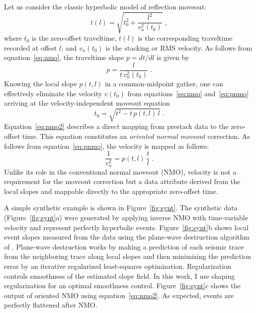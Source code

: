 
Let us consider the classic hyperbolic model of reflection moveout:
\begin{equation}
  \label{eq:nmo}
  t(l) = \sqrt{t_0^2 + \frac{l^2}{v_n^2(t_0)}}\;,
\end{equation}
where $t_0$ is the zero-offset traveltime, $t(l)$ is the corresponding
traveltime recorded at offset $l$, and $v_n(t_0)$ is the stacking or
RMS velocity. As follows from equation~\ref{eq:nmo}, the traveltime slope $p= d t/d l$ is given by 
\begin{equation}
  {p} = {\frac{l}{t\,v_n^2(t_0)}}\;.
  \label{eq:pnmo}
\end{equation}
Knowing the local slope $p(t,l)$ in a common-midpoint gather, one can
effectively eliminate the velocity $v(t_0)$ from
equations~\ref{eq:nmo} and~\ref{eq:pnmo} arriving at the
velocity-independent moveout equation \cite[]{Ottolini.sep.37.59}
\begin{equation}
  \label{eq:nmo2}
  t_0 = \sqrt{t^2 - t\,p(t,l)\,l}\;.
\end{equation}
Equation~\ref{eq:nmo2} describes a direct mapping from prestack data
to the zero-offset time. This equation constitutes an \emph{oriented
normal moveout} correction. As follows from equation~\ref{eq:pnmo},
the velocity is mapped as follows:
\begin{equation}
  {\frac{1}{v_n^2}} = p(t,l)\,{\frac{t}{l}}\;. 
  \label{eq:vnmo}
\end{equation}
Unlike its role in the conventional normal moveout (NMO), velocity is
not a requirement for the moveout correction but 
 a data attribute derived from the local slopes and mappable
directly to the appropriate zero-offset time.

A simple synthetic example is shown in Figure~\ref{fig:synt}. The
synthetic data (Figure~\ref{fig:synt}a) were generated by applying
inverse NMO with time-variable velocity and represent perfectly
hyperbolic events. Figure~\ref{fig:synt}b shows local event slopes
measured from the data using the plane-wave destruction algorithm of
\cite{GEO67-06-19461960}. Plane-wave destruction
\cite[]{Claerbout.blackwell.92} works by making a prediction of each
seismic trace from the neighboring trace along local slopes and then
minimizing the prediction error by an iterative regularized
least-squares optimization. Regularization controls smoothness of the
estimated slope field. In this work, I use shaping regularization
\cite[]{shape} for an optimal smoothness control.
Figure~\ref{fig:synt}c shows the output of oriented NMO using
equation~\ref{eq:nmo2}. As expected,   events are
perfectly flattened after NMO.

